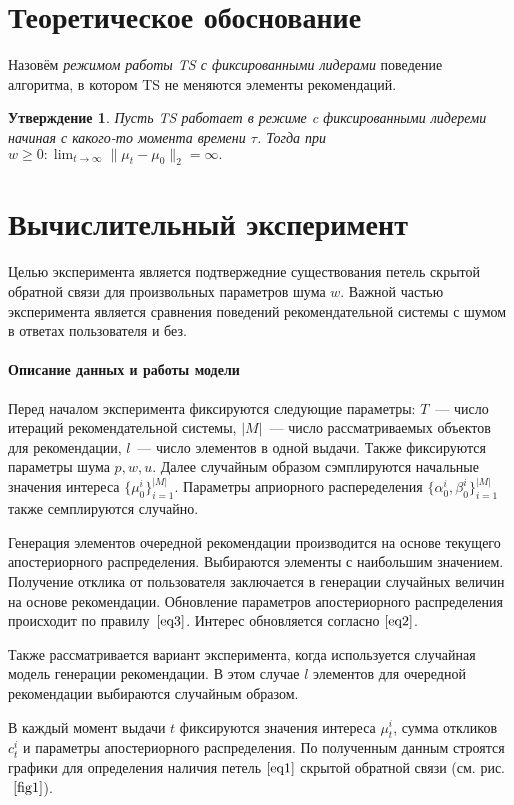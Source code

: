 \documentclass[12pt, twoside]{article}
\newtheorem{statement}{Утверждение}
\begin{document}
\section{Теоретическое обоснование}
Назовём \textit{режимом работы TS с фиксированными лидерами} поведение алгоритма, в котором TS не меняются элементы рекомендаций.

\begin{statement}
  Пусть  TS работает в режиме c фиксированными лидереми начиная с какого-то момента времени $\tau$. Тогда при $w \geq 0 : \lim_{t \to \infty} \|\mu_t - \mu_0 \|_2 = \infty.$
\end{statement}
 
\section{Вычислительный эксперимент }
Целью эксперимента является подтвержедние существования петель скрытой обратной связи для произвольных параметров шума $w$. 
Важной частью эксперимента является сравнения поведений рекомендательной системы с шумом в ответах пользователя и без. 

\paragraph{Описание данных и работы модели}
Перед началом эксперимента фиксируются следующие параметры: $T$~--- число итераций рекомендательной системы, $|M|$~--- число рассматриваемых объектов для рекомендации, $l$~--- число элементов в одной выдачи. 
Также фиксируются параметры шума $p, w, u$.
Далее случайным образом сэмплируются начальные значения интереса $\{\mu_0^i\}_{i=1}^{|M|}$. 
Параметры априорного распеределения $\{\alpha_0^i, \beta_0^i\}_{i=1}^{|M|}$  также семплируются случайно.

Генерация элементов очередной рекомендации производится на основе текущего апостериорного распределения. 
Выбираются элементы с наибольшим значением. 
Получение отклика от пользователя заключается в генерации случайных величин на основе рекомендации.
Обновление параметров апостериорного распределения происходит по правилу~$\eqref{eq3}$. 
Интерес обновляется согласно $\eqref{eq2}$.

Также рассматривается вариант эксперимента, когда используется случайная модель генерации рекомендации. 
В этом случае $l$ элементов для очередной рекомендации выбираются случайным образом. 

В каждый момент выдачи $t$ фиксируются значения интереса $\mu_t^i$, сумма откликов $c_t^i$ и параметры апостериорного распределения. 
По полученным данным строятся графики для определения наличия петель $\eqref{eq1}$ скрытой обратной связи (см. рис.$~\ref{fig1}$).
\end{document}
